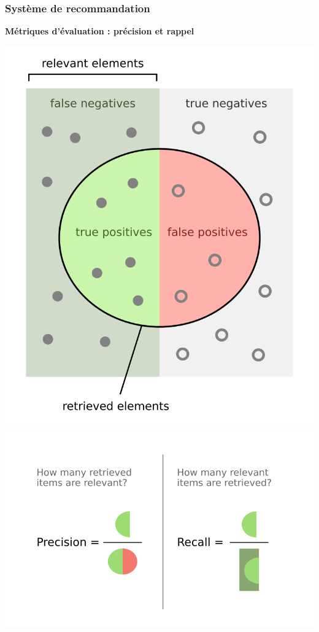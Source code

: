 \documentclass{beamer}
\begin{document}
\begin{frame}
    \scriptsize
    \frametitle{Système de recommandation}
    \vspace{0.3cm}
    {\large\textbf{Métriques d’évaluation : précision et rappel}\\}
    \vspace{0.3cm}

    \begin{minipage}{0.3\linewidth}
        \centering
        \includegraphics[width=\linewidth]{dataset_recall.png}
    \end{minipage}
    \hfill
    \begin{minipage}{0.65\linewidth}
        \centering
        \includegraphics[width=\linewidth]{Precisionrecall.png}
    \end{minipage}


    \vspace{0.3cm}

\end{frame}
\end{document}
